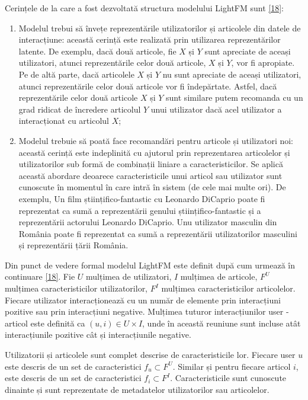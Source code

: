 \vspace{5mm}
Cerințele de la care a fost dezvoltată structura modelului LightFM sunt \hyperlink{maciejlightfm}{[18]}:
\begin{enumerate}
	\item Modelul trebui să învețe reprezentările utilizatorilor și articolele din datele de interacțiune: această cerință este realizată prin utilizarea reprezentărilor latente. De exemplu, dacă două articole, fie $X$ și $Y$ sunt apreciate de aceași utilizatori, atunci reprezentările celor două articole, $X$ și $Y$, vor fi apropiate. Pe de altă parte, dacă articolele $X$ și $Y$ nu sunt apreciate de aceași utilizatori, atunci reprezentările celor două articole vor fi îndepărtate. Astfel, dacă reprezentările celor două articole $X$ și $Y$ sunt similare putem recomanda cu un grad ridicat de încredere articolul $Y$ unui utilizator dacă acel utilizator a interacționat cu articolul $X$;
	\item Modelul trebuie să poată face recomandări pentru articole și utilizatori noi: această cerință este indeplinită cu ajutorul prin reprezentarea articolelor și utilizatorilor sub formă de combinații liniare a caracteristicilor. Se aplică această abordare deoarece caracteristicile unui articol sau utilizator sunt cunoscute în momentul în care intră în sistem (de cele mai multe ori). De exemplu, Un film științifico-fantastic cu Leonardo DiCaprio poate fi reprezentat ca sumă a reprezentării genului științifico-fantastic și a reprezentării actorului Leonardo DiCaprio. Unu utilizator masculin din România poate fi reprezentat ca sumă a reprezentării utilizatorilor masculini și reprezentării țării România.
\end{enumerate}

\vspace{5mm}
Din punct de vedere formal modelul LightFM este definit după cum urmează în continuare \hyperlink{maciejlightfm}{[18]}.
Fie $U$ mulțimea de utilizatori, $I$ mulțimea de articole, $F^U$ mulțimea caracteristicilor utilizatorilor, $F^I$ mulțimea caracteristicilor articolelor. Fiecare utilizator interacționează cu un număr de elemente prin interacțiuni pozitive sau prin interacțiuni negative. Mulțimea tuturor interacțiunilor user - articol este definită ca $(u,i) \in U \times I$, unde în această reuniune sunt incluse atât interacțiunile pozitive cât și interacțiunile negative.

Utilizatorii și articolele sunt complet descrise de caracteristicile lor. Fiecare user $u$ este descris de un set de caracteristici $f_u \subset F^U$. Similar și pentru fiecare articol $i$, este descris de un set de caracteristici $f_i \subset F^I$. Caracteristicile sunt cunoscute dinainte și sunt reprezentate de metadatelor utilizatorilor sau articolelor.

